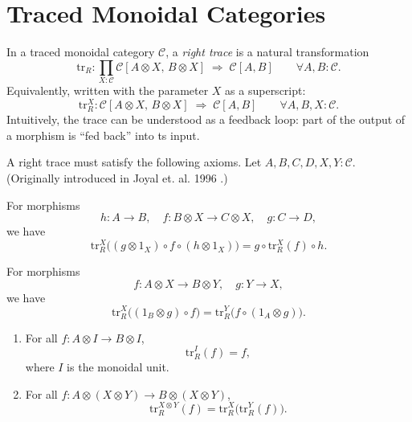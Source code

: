 \section{Traced Monoidal Categories} \label{traced-monoidal-categories}
\begin{definition}
        \label{def:trace}
	In a traced monoidal category $\mathcal{C}$, a \emph{right trace} is a natural transformation
	$$
		\mathrm{tr}_{R} : \prod_{X : \mathcal{C}} \mathcal{C}[A \otimes X,\, B \otimes X]
		\;\Rightarrow\; \mathcal{C}[A,B]
		\qquad \forall A,B : \mathcal{C}.
	$$
	Equivalently, written with the parameter $X$ as a superscript:
	$$
		\mathrm{tr}_{R}^{X} : \mathcal{C}[A \otimes X,\, B \otimes X]
		\;\Rightarrow\; \mathcal{C}[A,B]
		\qquad \forall A,B,X : \mathcal{C}.
	$$
	Intuitively, the trace can be understood as a feedback loop: part of the output of a morphism is ``fed back'' into ts input.
\end{definition}
A right trace must satisfy the following axioms.
Let $A,B,C,D,X,Y : \mathcal{C}$. (Originally introduced in Joyal et. al. 1996 \cite{joyal1996-traced-monoidal-categories}.) 
\begin{axiom}[Tightening]
        \label{axiom:tightening}
	For morphisms
	$$
		h : A \to B,
		\quad f : B \otimes X \to C \otimes X,
		\quad g : C \to D,
	$$
	we have
	$$
		\mathrm{tr}_{R}^{X}\!\big( (g \otimes 1_X) \circ f \circ (h \otimes 1_X) \big)
		= g \circ \mathrm{tr}_{R}^{X}(f) \circ h.
	$$
\end{axiom}
\begin{axiom}[Sliding]
        \label{axiom:sliding}
	For morphisms
	$$
		f : A \otimes X \to B \otimes Y,
		\quad g : Y \to X,
	$$
	we have
	$$
		\mathrm{tr}_{R}^{X}\!\big( (1_B \otimes g) \circ f \big)
		= \mathrm{tr}_{R}^{Y}\!\big( f \circ (1_A \otimes g) \big).
	$$
\end{axiom}
\begin{axiom}[Vanishing]
        \label{axiom:vanishing}
	\begin{enumerate}
		\item For all $f : A \otimes I \to B \otimes I$,
		      $$
			      \mathrm{tr}_{R}^{I}(f) = f,
		      $$
		      where $I$ is the monoidal unit.
		\item For all $f : A \otimes (X \otimes Y) \to B \otimes (X \otimes Y)$,
		      $$
			      \mathrm{tr}_{R}^{X \otimes Y}(f)
			      = \mathrm{tr}_{R}^{X}\!\big( \mathrm{tr}_{R}^{Y}(f) \big).
		      $$
	\end{enumerate}
\end{axiom}

